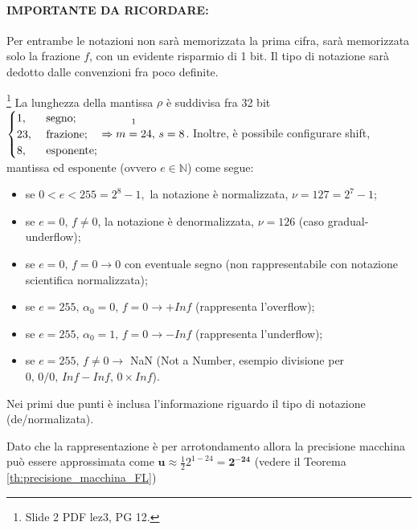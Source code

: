 \paragraph{IMPORTANTE DA RICORDARE: }Per entrambe le notazioni non sarà memorizzata la prima cifra, sarà memorizzata solo la frazione $f$, con un evidente risparmio di 1 bit. Il tipo di notazione sarà dedotto dalle convenzioni fra poco definite.

\begin{definition}\footnote{Slide 2 PDF lez3, PG 12.}
	La lunghezza della mantissa $\rho$ è suddivisa fra 32 bit $\begin{cases}
		1, &\text{ segno};\\
		23, &\text{ frazione};\\
		8, &\text{ esponente};
	\end{cases}\Rightarrow \overset{\footnotemark}{m=24},\, s=8$. Inoltre, è possibile configurare shift, mantissa ed esponente (ovvero $e\in\mathbb N$) come segue:
	
	\begin{itemize}
		\item se $0<e<255=2^8-1,$ la notazione è normalizzata, $\nu=127=2^7-1$;
		\item se $e=0,\, f\neq 0$, la notazione è denormalizzata, $\nu=126$ (caso gradual-underflow);
		\item se $e=0,\, f=0\rightarrow 0$ con eventuale segno (non rappresentabile con notazione scientifica normalizzata);
		\item se $e=255,\,\alpha_0=0,\,f=0\rightarrow +Inf$ (rappresenta l'overflow);
		\item se $e=255,\,\alpha_0=1,\,f=0\rightarrow -Inf$ (rappresenta l'underflow);
		\item se $e=255, \,f\neq 0 \rightarrow$ NaN (Not a Number, esempio divisione per $0,\, 0/0,\, Inf-Inf,\, 0\times Inf$).
	\end{itemize}
\end{definition}
Nei primi due punti è inclusa l'informazione riguardo il tipo di notazione (de/normalizata).

\begin{remark}
	Dato che la rappresentazione è per arrotondamento allora la precisione macchina può essere approssimata come $\boldsymbol{u\approx} \frac{1}{2} 2^{1-24} = \boldsymbol{2^{-24}}$ (vedere il Teorema \ref{th:precisione_macchina_FL})
\end{remark}

